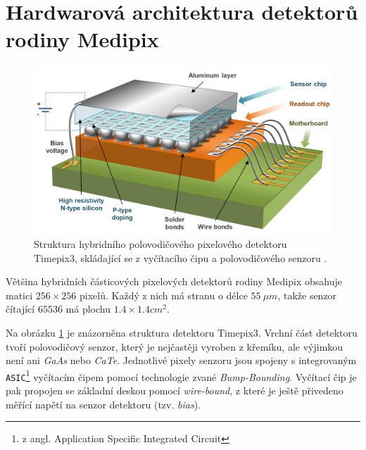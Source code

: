 \section{Hardwarová architektura detektorů rodiny Medipix}
\begin{figure}[th]
	\begin{center}
		\includegraphics[width=12cm]{figures/det_chip.png}
		\caption{Struktura hybridního polovodičového pixelového detektoru Timepix3, skládající se z vyčítacího čipu a polovodičového senzoru \cite{PlatkevicDisertace}.}
		\label{fig:det:chip}
	\end{center}
\end{figure}
Většina hybridních částicových pixelových detektorů rodiny Medipix obsahuje matici $256\times256$ pixelů. Každý z nich má stranu o délce $55~\mu m$, takže senzor čítající $65536$ má plochu $1.4 \times 1.4 cm^2$. 

Na obrázku \ref{fig:det:chip} je znázorněna struktura detektoru Timepix3. Vrchní část detektoru tvoří polovodičový senzor, který je nejčastěji vyroben z křemíku, ale výjimkou není ani \textit{GaAs} nebo \textit{CaTe}. Jednotlivé pixely senzoru jsou spojeny s integrovaným \texttt{ASIC}\footnote{z angl. Application Specific Integrated Circuit} vyčítacím čipem pomocí technologie zvané \textit{Bump-Bounding}. Vyčítací čip je pak propojen se základní deskou pomocí \textit{wire-bound}, z které je ještě přivedeno měřící napětí na senzor detektoru (tzv. \textit{bias}).



